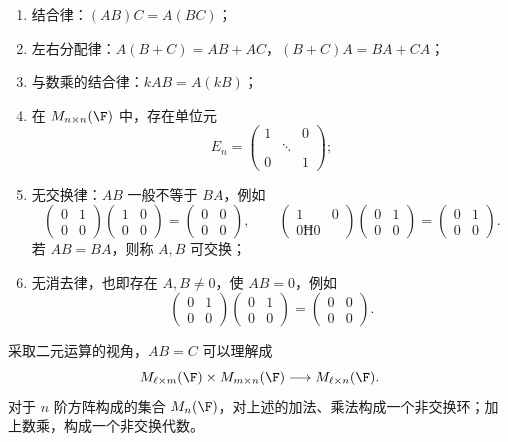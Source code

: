 \begin{enumerate}
	\item 结合律：$(AB)C=A(BC)$；
	\item 左右分配律：$A(B+C)=AB+AC$，$(B+C)A=BA+CA$；
	\item 与数乘的结合律：$kAB=A(kB)$；
	\item 在 $M_{n\times n}(\F)$ 中，存在单位元
	\[
	E_n=\begin{pmatrix}
		1& &0\\
		&\ddots& \\
		0& &1
	\end{pmatrix};
	\]
	\item 无交换律：$AB$ 一般不等于 $BA$，例如
	\[
	\begin{pmatrix}0&1\\0&0\end{pmatrix}
	\begin{pmatrix}1&0\\0&0\end{pmatrix}
	=
	\begin{pmatrix}0&0\\0&0\end{pmatrix},
	\qquad
	\begin{pmatrix}1&0\\0Ħ0\end{pmatrix}
	\begin{pmatrix}0&1\\0&0\end{pmatrix}
	=
	\begin{pmatrix}0&1\\0&0\end{pmatrix}.
	\]
	若 $AB=BA$，则称 $A,B$ 可交换；
	\item 无消去律，也即存在 $A,B\neq0$，使 $AB=0$，例如
	\[
	\begin{pmatrix}0&1\\0&0\end{pmatrix}
	\begin{pmatrix}0&1\\0&0\end{pmatrix}
	=
	\begin{pmatrix}0&0\\0&0\end{pmatrix}.
	\]
\end{enumerate}
采取二元运算的视角，$AB=C$ 可以理解成
\[
M_{\ell\times m}(\F)\times M_{m\times n}(\F)
\longrightarrow M_{\ell\times n}(\F).
\]
对于 $n$ 阶方阵构成的集合 $M_n(\F)$，对上述的加法、乘法构成一个非交换环；加上数乘，构成一个非交换代数。

